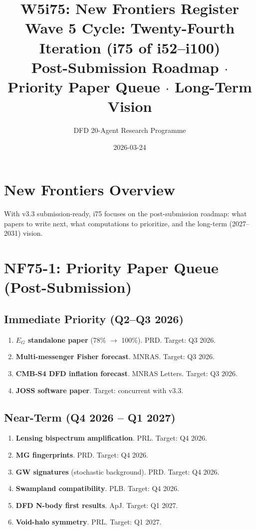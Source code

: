 \documentclass[11pt,a4paper]{article}
\title{\Large W5i75: New Frontiers Register\\[6pt]
\normalsize Wave 5 Cycle: Twenty-Fourth Iteration (i75 of i52--i100)\\[6pt]
Post-Submission Roadmap $\cdot$ Priority Paper Queue $\cdot$ Long-Term Vision}
\author{DFD 20-Agent Research Programme}
\date{2026-03-24}
\begin{document}
\maketitle

\section{New Frontiers Overview}

With v3.3 submission-ready, i75 focuses on the post-submission roadmap: what papers to write next, what computations to prioritize, and the long-term (2027--2031) vision.

\section{NF75-1: Priority Paper Queue (Post-Submission)}

\subsection{Immediate Priority (Q2--Q3 2026)}
\begin{enumerate}
\item \textbf{$E_G$ standalone paper} (78\% $\to$ 100\%). PRD. Target: Q3 2026.
\item \textbf{Multi-messenger Fisher forecast}. MNRAS. Target: Q3 2026.
\item \textbf{CMB-S4 DFD inflation forecast}. MNRAS Letters. Target: Q3 2026.
\item \textbf{JOSS software paper}. Target: concurrent with v3.3.
\end{enumerate}

\subsection{Near-Term (Q4 2026 -- Q1 2027)}
\begin{enumerate}[resume]
\item \textbf{Lensing bispectrum amplification}. PRL. Target: Q4 2026.
\item \textbf{MG fingerprints}. PRD. Target: Q4 2026.
\item \textbf{GW signatures} (stochastic background). PRD. Target: Q4 2026.
\item \textbf{Swampland compatibility}. PLB. Target: Q4 2026.
\item \textbf{DFD N-body first results}. ApJ. Target: Q1 2027.
\item \textbf{Void-halo symmetry}. PRL. Target: Q1 2027.
\end{enumerate}
\end{document}
